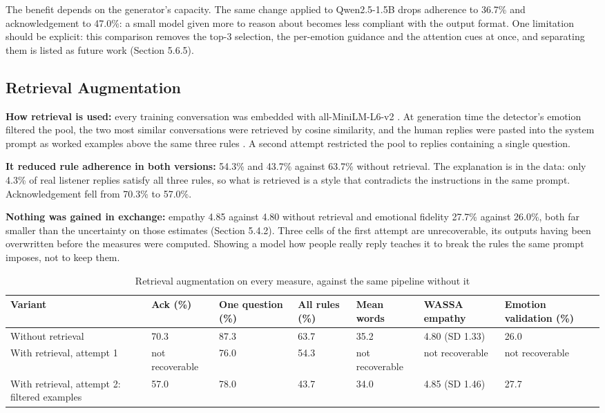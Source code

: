 The benefit depends on the generator's capacity. The same change applied to Qwen2.5-1.5B drops adherence to 36.7\% and acknowledgement to 47.0\%: a small model given more to reason about becomes less compliant with the output format. One limitation should be explicit: this comparison removes the top-3 selection, the per-emotion guidance and the attention cues at once, and separating them is listed as future work (Section 5.6.5).

\subsection{Retrieval Augmentation}
\label{sec:5.2.5}

\textbf{How retrieval is used:} every training conversation was embedded with all-MiniLM-L6-v2 \cite{reimers2019sbert}. At generation time the detector's emotion filtered the pool, the two most similar conversations were retrieved by cosine similarity, and the human replies were pasted into the system prompt as worked examples above the same three rules \cite{lewis2020rag}. A second attempt restricted the pool to replies containing a single question.

\textbf{It reduced rule adherence in both versions:} 54.3\% and 43.7\% against 63.7\% without retrieval. The explanation is in the data: only 4.3\% of real listener replies satisfy all three rules, so what is retrieved is a style that contradicts the instructions in the same prompt. Acknowledgement fell from 70.3\% to 57.0\%.

\textbf{Nothing was gained in exchange:} empathy 4.85 against 4.80 without retrieval and emotional fidelity 27.7\% against 26.0\%, both far smaller than the uncertainty on those estimates (Section 5.4.2). Three cells of the first attempt are unrecoverable, its outputs having been overwritten before the measures were computed. Showing a model how people really reply teaches it to break the rules the same prompt imposes, not to keep them.

\begin{table}[htbp]
\centering
\scriptsize
\begin{tabularx}{\textwidth}{@{}lXXXXXX@{}}
\toprule
\textbf{Variant} & \textbf{Ack (\%)} & \textbf{One question (\%)} & \textbf{All rules (\%)} & \textbf{Mean words} & \textbf{WASSA empathy} & \textbf{Emotion validation (\%)} \\
\midrule
Without retrieval & 70.3 & 87.3 & 63.7 & 35.2 & 4.80 (SD 1.33) & 26.0 \\
With retrieval, attempt 1 & not recoverable & 76.0 & 54.3 & not recoverable & not recoverable & not recoverable \\
With retrieval, attempt 2: filtered examples & 57.0 & 78.0 & 43.7 & 34.0 & 4.85 (SD 1.46) & 27.7 \\
\bottomrule
\end{tabularx}
\caption{Retrieval augmentation on every measure, against the same pipeline without it}
\label{tab:5.3}
\end{table}

